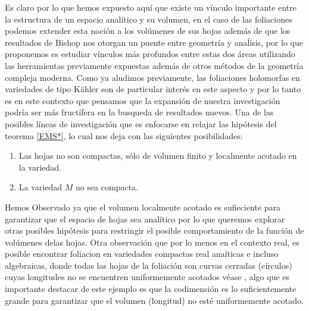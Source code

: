 \documentclass[letterpaper]{report}
\begin{document}
Es claro por lo que hemos expuesto aqu\'i que existe un v\'inculo importante entre la estructura de un espacio anal\'itico y su volumen,
en el caso de las foliaciones podemos extender esta noci\'on a los vol\'umenes de sus hojas adem\'as de que los resultados de Bishop 
nos otorgan un puente entre geometr\'ia y ana\'lisis, por lo que proponemos es estudiar v\'inculos m\'as profundos entre estas
dos \'areas utilizando las herramientas previamente expuestas adem\'as de otros m\'etodos de la geometr\'ia compleja moderna.
Como ya aludimos previamente, las foliaciones holomorfas en variedades de tipo K\"ahler son de particular inter\'es en este aspecto
y por lo tanto es en este contexto que pensamos que la expansi\'on de nuestra investigaci\'on podr\'ia ser m\'as fruct\'ifera en la
busqueda de resultados nuevos. Una de las posibles l\'ineas de investigaci\'on que es enfocarse en relajar las hip\'otesis del 
teorema \ref{EMS*}, lo cual nos deja con las siguientes posibilidades:
\begin{enumerate}
        \item Las hojas no son compactas, s\'olo de volumen finito y localmente acotado en la variedad.
        \item La variedad $M$ no sea compacta.
\end{enumerate}
\noindent Hemos Observado ya que el volumen localmente acotado es sufieciente para garantizar que el espacio de hojas sea anal\'itico 
por lo que queremos explorar otras posibles hip\'otesis para restringir el posible comportamiento de la funci\'on de vol\'umenes
delas hojas.
Otra observaci\'on que por lo menos en el contexto real, es posible encontrar foliacion en variedades compactas real ana\'iticas e
incluso algebraicas, donde todas las hojas de la foliaci\'on son curvas cerradas (c\'irculos) cuyas longitudes no se encuentren 
uniformemente acotados v\'ease \cite{E-V}, algo que es importante destacar de este ejemplo es que la codimensi\'on es lo
suficientemente grande para garantizar que el volumen (longitud) no est\'e uniformemente acotado.
\end{document}
